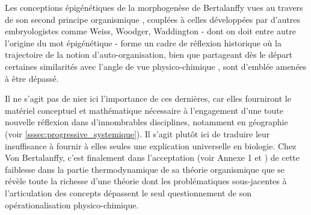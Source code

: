 

Les conceptions épigénétiques de la morphogenèse de Bertalanffy vues au travers de son second principe organismique , couplées à celles développées par d'autres embryologistes comme Weiss, Woodger, Waddington - dont on doit entre autre l'origine du mot épigénétique -  forme un cadre de réflexion historique où la trajectoire de la notion d'auto-organisation, bien que partageant dès le départ certaines similarités avec l'angle de vue physico-chimique \autocite{Prigogine1946}, sont d'emblée amenées à être dépassé.

Il ne s'agit pas de nier ici l'importance de ces dernières, car elles fourniront le matériel conceptuel et mathématique nécessaire à l'engagement d'une toute nouvelle réflexion dans d'innombrables disciplines, notamment en géographie (voir \ref{sssec:progressive_systemique}). Il s'agit plutôt ici de traduire leur insuffisance à fournir à elles seules une explication universelle en biologie. Chez Von Bertalanffy, c'est finalement dans l’acceptation (voir Annexe 1 et \autocite[657-661]{Pouvreau2013}) de cette faiblesse dans la partie thermodynamique de sa théorie organismique que se révèle toute la richesse d'une théorie dont les problématiques sous-jacentes à l'articulation des concepts dépassent le seul questionnement de son opérationalisation physico-chimique. 


